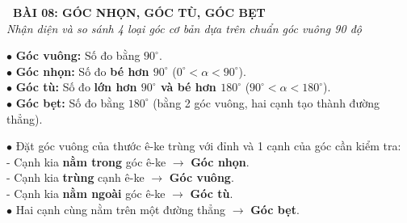 \documentclass[14pt,a4paper,oneside]{extbook}
\begin{document}
\noindent
\begin{tcolorbox}[
  enhanced,
  colback=teal!8!white,
  colframe=teal!80!black,
  arc=3mm, boxrule=1pt,
  left=3mm, right=3mm, top=2mm, bottom=2mm,
  halign=center
]
  {\Large\bfseries\color{teal!90!black}\faBookmark\ BÀI 08: GÓC NHỌN, GÓC TÙ, GÓC BẸT}\\[1.5pt]
  {\footnotesize\itshape\color{black!75} Nhận diện và so sánh 4 loại góc cơ bản dựa trên chuẩn góc vuông 90 độ}
\end{tcolorbox}

\vspace{2.5mm}

\noindent
\begin{minipage}[t]{0.49\textwidth}
  \begin{tcolorbox}[
    enhanced,
    title={\footnotesize\bfseries\color{white}\faShapes\ 1. Bốn loại góc cơ bản},
    colback=blue!2!white,
    colframe=blue!75!black,
    arc=2.5mm, boxrule=0.8pt, top=1.8mm, bottom=1.8mm, left=2mm, right=2mm
  ]
    \footnotesize
    $\bullet$ \textbf{Góc vuông:} Số đo bằng \textbf{$90^\circ$}.\\
    $\bullet$ \textbf{Góc nhọn:} Số đo \textbf{bé hơn $90^\circ$} ($0^\circ < \alpha < 90^\circ$).\\
    $\bullet$ \textbf{Góc tù:} Số đo \textbf{lớn hơn $90^\circ$ và bé hơn $180^\circ$} ($90^\circ < \alpha < 180^\circ$).\\
    $\bullet$ \textbf{Góc bẹt:} Số đo bằng \textbf{$180^\circ$} (bằng 2 góc vuông, hai cạnh tạo thành đường thẳng).
  \end{tcolorbox}
\end{minipage}%
\hfill
\begin{minipage}[t]{0.49\textwidth}
  \begin{tcolorbox}[
    enhanced,
    title={\footnotesize\bfseries\color{white}\faCheck\ 2. Dùng ê-ke để kiểm tra},
    colback=teal!2!white,
    colframe=teal!75!black,
    arc=2.5mm, boxrule=0.8pt, top=1.8mm, bottom=1.8mm, left=2mm, right=2mm
  ]
    \footnotesize
    $\bullet$ Đặt góc vuông của thước ê-ke trùng với đỉnh và 1 cạnh của góc cần kiểm tra:\\
    - Cạnh kia \textbf{nằm trong} góc ê-ke $\rightarrow$ \textbf{Góc nhọn}.\\
    - Cạnh kia \textbf{trùng} cạnh ê-ke $\rightarrow$ \textbf{Góc vuông}.\\
    - Cạnh kia \textbf{nằm ngoài} góc ê-ke $\rightarrow$ \textbf{Góc tù}.\\
    $\bullet$ Hai cạnh cùng nằm trên một đường thẳng $\rightarrow$ \textbf{Góc bẹt}.
  \end{tcolorbox}
\end{minipage}
\end{document}
